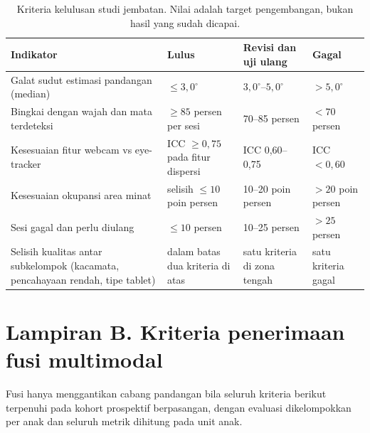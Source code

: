 \documentclass[10pt,letterpaper]{article}
\begin{document}
\begin{table}[H]
\centering
\small
\caption{Kriteria kelulusan studi jembatan. Nilai adalah target pengembangan, bukan hasil
yang sudah dicapai.}
\label{tab:gonogo}
\begin{tabular}{@{}p{}p{}p{}p{}@{}}
\toprule
\textbf{Indikator} & \textbf{Lulus} & \textbf{Revisi dan uji ulang} & \textbf{Gagal} \\
\midrule
Galat sudut estimasi pandangan (median) & $\leq 3{,}0^\circ$ & $3{,}0^\circ$--$5{,}0^\circ$ & $> 5{,}0^\circ$ \\
Bingkai dengan wajah dan mata terdeteksi & $\geq 85$ persen per sesi & 70--85 persen & $< 70$ persen \\
Kesesuaian fitur webcam vs eye-tracker & ICC $\geq 0{,}75$ pada fitur dispersi & ICC 0,60--0,75 & ICC $< 0{,}60$ \\
Kesesuaian okupansi area minat & selisih $\leq 10$ poin persen & 10--20 poin persen & $> 20$ poin persen \\
Sesi gagal dan perlu diulang & $\leq 10$ persen & 10--25 persen & $> 25$ persen \\
Selisih kualitas antar subkelompok (kacamata, pencahayaan rendah, tipe tablet) & dalam batas dua kriteria di atas & satu kriteria di zona tengah & satu kriteria gagal \\
\bottomrule
\end{tabular}
\end{table}

\section*{Lampiran B. Kriteria penerimaan fusi multimodal}

Fusi hanya menggantikan cabang pandangan bila seluruh kriteria berikut terpenuhi pada
kohort prospektif berpasangan, dengan evaluasi dikelompokkan per anak dan seluruh metrik
dihitung pada unit anak.
\end{document}
